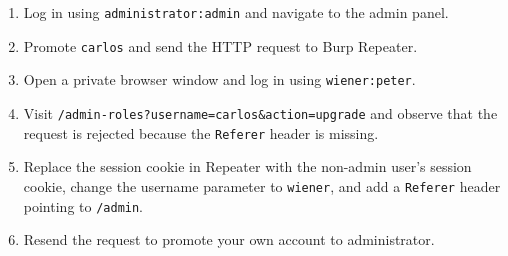 \documentclass[11pt,a4paper]{article}
\begin{document}
\begin{enumerate}
    \item Log in using \texttt{administrator:admin} and navigate to the admin panel.
    \item Promote \texttt{carlos} and send the HTTP request to Burp Repeater.
    \item Open a private browser window and log in using \texttt{wiener:peter}.
    \item Visit \texttt{/admin-roles?username=carlos\&action=upgrade} and observe that the request is rejected because the \texttt{Referer} header is missing.
    \item Replace the session cookie in Repeater with the non-admin user's session cookie, change the username parameter to \texttt{wiener}, and add a \texttt{Referer} header pointing to \texttt{/admin}.
    \item Resend the request to promote your own account to administrator.
\end{enumerate}
\end{document}
